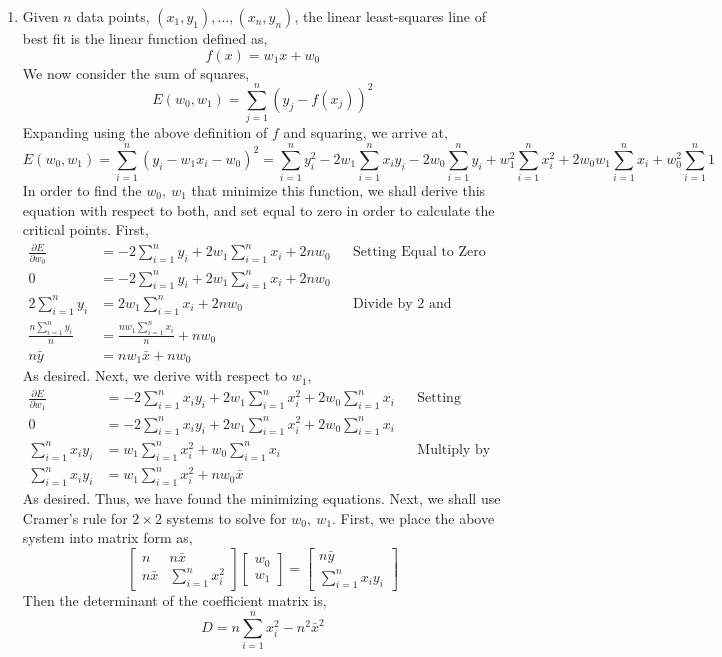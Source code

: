 \documentclass[letterpaper,10pt]{article}
\newcommand{\sx}{\sum_{i=1}^nx_i}
\newcommand{\sy}{\sum_{i=1}^ny_i}
\newcommand{\sxy}{\sum_{i=1}^nx_iy_i}
\begin{document}
\begin{enumerate}
\item Given $n$ data points, $(x_1,y_1),\ldots,(x_n,y_n)$, the linear least-squares line of best fit is the linear function defined as,
\[f(x)=w_1x+w_0\]
We now consider the sum of squares,
\[E(w_0,w_1)=\sum_{j=1}^n(y_j-f(x_j))^2\]
Expanding using the above definition of $f$ and squaring, we arrive at,
\[E(w_0,w_1)=\sum_{i=1}^n(y_i-w_1x_i-w_0)^2=\sum_{i=1}^ny_i^2-2w_1\sxy-2w_0\sy+w_1^2\sum_{i=1}^nx_i^2+2w_0w_1\sx+w_0^2\sum_{i=1}^n1\]
In order to find the $w_0,\ w_1$ that minimize this function, we shall derive this equation with respect to both, and set equal to zero in order to calculate the critical points. First,
\begin{align*}
\frac{\partial E}{\partial w_0} &= -2\sy+2w_1\sx+2nw_0 && \text{Setting Equal to Zero and Solving}\\
0 &=-2\sy+2w_1\sx+2nw_0\\
2\sy &= 2w_1\sx+2nw_0 && \text{Divide by 2 and multiply by ``1"}\\
\frac{n\sy}{n} &= \frac{nw_1\sx}{n}+nw_0\\
n\bar{y}&=nw_1\bar{x}+nw_0
\end{align*}
As desired. Next, we derive with respect to $w_1$,
\begin{align*}
\frac{\partial E}{\partial w_1} &= -2\sxy+2w_1\sum_{i=1}^nx_i^2+2w_0\sx && \text{Setting Equal to Zero and Solving}\\
0 &= -2\sxy+2w_1\sum_{i=1}^nx_i^2+2w_0\sx\\
\sxy &= w_1\sum_{i=1}^nx_i^2+w_0\sx && \text{Multiply by ``1" as before}\\
\sxy &= w_1\sum_{i=1}^nx_i^2+nw_0\bar{x}
\end{align*}
As desired. Thus, we have found the minimizing equations. Next, we shall use Cramer's rule for $2\times 2$ systems to solve for $w_0,\ w_1$.  First, we place the above system into matrix form as,
\[\begin{bmatrix}
n & n\bar{x} \\
n\bar{x} & \sum_{i=1}^n x_i^2
\end{bmatrix}
\begin{bmatrix}
w_0 \\
w_1
\end{bmatrix}=\begin{bmatrix}
n\bar{y}\\
\sxy
\end{bmatrix}\]
Then the determinant of the coefficient matrix is, \[D=n\sum_{i=1}^n x_i^2-n^2\bar{x}^2\]

\end{enumerate}
\end{document}
